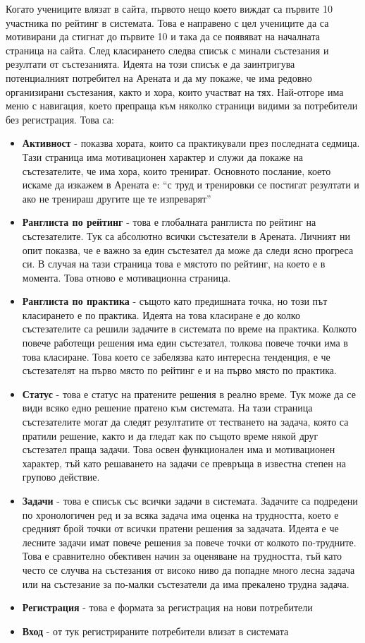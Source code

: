 \documentclass[a4paper,12pt]{article}
\begin{document}
  Когато учениците влязат в сайта, първото нещо което виждат са първите 10 участника по рейтинг в системата. Това е направено с цел учениците да са мотивирани да стигнат до първите 10 и така да се появяват на началната страница на сайта.
  След класирането следва списък с минали състезания и резултати от състезанията. Идеята на този списък е да заинтригува потенциалният потребител на Арената и да му покаже, че има редовно организирани състезания, както и хора, които участват на тях.
  Най-отгоре има меню с навигация, което препраща към няколко страници видими за потребители без регистрация. Това са:
  
  \begin{itemize}
    \item \textbf{Активност} - показва хората, които са практикували през последната седмица. Тази страница има мотивационен характер и служи да покаже на състезателите, че има хора, които тренират. Основното послание, което искаме да изкажем в Арената е: ``с труд и тренировки се постигат резултати и ако не тренираш другите ще те изпреварят''
    \item \textbf{Ранглиста по рейтинг} - това е глобалната ранглиста по рейтинг на състезателите. Тук са абсолютно всички състезатели в Арената. Личният ни опит показва, че е важно за един състезател да може да следи ясно прогреса си. В случая на тази страница това е мястото по рейтинг, на което е в момента. Това отново е мотивационна страница.
    \item \textbf{Ранглиста по практика} - същото като предишната точка, но този път класирането е по практика. Идеята на това класиране е до колко състезателите са решили задачите в системата по време на практика. Колкото повече работещи решения има един състезател, толкова повече точки има в това класиране. Това което се забелязва като интересна тенденция, е че състезателят на първо място по рейтинг е и на първо място по практика.
    \item \textbf{Статус} - това е статус на пратените решения в реално време. Тук може да се види всяко едно решение пратено към системата. На тази страница състезателите могат да следят резултатите от тестването на задача, която са пратили решение, както и да гледат как по същото време някой друг състезател праща задачи. Това освен функционален има и мотивационен характер, тъй като решаването на задачи се превръща в известна степен на групово действие.
    \item \textbf{Задачи} - това е списък със всички задачи в системата. Задачите са подредени по хронологичен ред и за всяка задача има оценка на трудността, което е средният брой точки от всички пратени решения за задачата. Идеята е че лесните задачи имат повече решения за повече точки от колкото по-трудните. Това е сравнително обективен начин за оценяване на трудността, тъй като често се случва на състезания от високо ниво да попадне много лесна задача или на състезание за по-малки състезатели да има прекалено трудна задача.
    \item \textbf{Регистрация} - това е формата за регистрация на нови потребители
    \item \textbf{Вход} - от тук регистрираните потребители влизат в системата
  \end{itemize}
\end{document}
